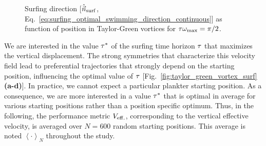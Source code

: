 \begin{figure}%
	\centering
	
	\caption[The surfing direction in a Taylor-Green cell.]{
		Surfing direction [$\hat{\vec{n}}_{\mathrm{surf}}$, Eq.~\eqref{eq:surfing_optimal_swimming_direction_continuous}] as function of position in Taylor-Green vortices for $\tau \omega_{\mathrm{max}} = \pi/2$.
	}
	\label{fig:taylor_green_vortex_surf_swimming_direction}
\end{figure}
We are interested in the value $\tau^*$ of the surfing time horizon $\tau$ that maximizes the vertical displacement.
The strong symmetries that characterize this velocity field lead to preferential trajectories that strongly depend on the starting position, influencing the optimal value of $\tau$ [Fig.~\ref{fig:taylor_green_vortex_surf}\textbf{(a-d)}].
In practice, we cannot expect a particular plankter starting position.
As a consequence, we are more interested in a value $\tau^*$ that is optimal in average for various starting positions rather than a position specific optimum.
Thus, in the following, the performance metric $V_{\mathrm{eff.}}$, corresponding to the vertical effective velocity, is averaged over $N=600$ random starting positions.
This average is noted $\left\langle \cdot \right\rangle_{N}$ throughout the study.


